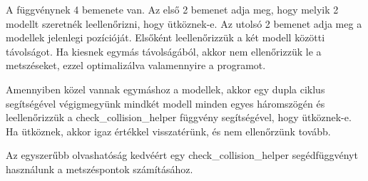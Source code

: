 A függvénynek 4 bemenete van. Az első 2 bemenet adja meg, hogy melyik 2 modellt szeretnék leellenőrizni, hogy ütköznek-e. Az utolsó 2 bemenet adja meg a modellek jelenlegi pozícióját.
Elsőként leellenőrizzük a két modell közötti távolságot. Ha kiesnek egymás távolságából, akkor nem ellenőrizzük le a metszéseket, ezzel optimalizálva valamennyire a programot. 

Amennyiben közel vannak egymáshoz a modellek, akkor egy dupla ciklus segítségével végigmegyünk mindkét modell minden egyes háromszögén és leellenőrizzük a check\_collision\_helper függvény segítségével, hogy ütköznek-e. Ha ütköznek, akkor igaz értékkel visszatérünk, és nem ellenőrzünk tovább.
\newpage

Az egyszerűbb olvashatóság kedvéért egy check\_collision\_helper segédfüggvényt használunk a metszéspontok számításához.

